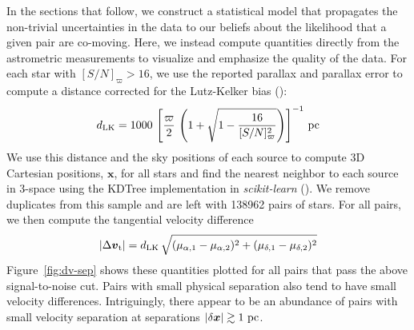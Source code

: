 \documentclass[manuscript, letterpaper]{aastex6}
\newcommand{\project}[1]{\textsl{#1}}
\newcommand{\figname}{Figure}
\newcommand{\bs}[1]{\boldsymbol{#1}}
\newcommand{\snr}{[S/N]_\varpi}
\begin{document}
In the sections that follow, we construct a statistical model that propagates
the non-trivial uncertainties in the data to our beliefs about the likelihood
that a given pair are co-moving. Here, we instead compute quantities directly
from the astrometric measurements to visualize and emphasize the quality of the
data. For each star with $\snr > 16$, we use the reported parallax and parallax
error to compute a distance corrected for the Lutz-Kelker bias
(\citealt{lutzkelker}):
\begin{equation}
  d_{\rm LK} = 1000 \, \left[\frac{\varpi}{2} \,
    \left(1 + \sqrt{1 - \frac{16}{\snr^2}} \right) \right]^{-1} \, {\rm pc}
\end{equation}
We use this distance and the sky positions of each source to compute 3D
Cartesian positions, $\boldsymbol{x}$, for all stars and find the nearest
neighbor to each source in 3-space using the KDTree implementation in
\project{scikit-learn} (\citealt{scikit-learn}). We remove duplicates from
this sample and are left with 138962 pairs of stars. For all pairs, we then
compute the tangential velocity difference
\begin{equation}
  |\Delta \bs{v}_{\rm t}| = d_{\rm LK} \,
                            \sqrt{(\mu_{\alpha,1}-\mu_{\alpha,2})^2 +
                                  (\mu_{\delta,1}-\mu_{\delta,2})^2}
\end{equation}
\figname~\ref{fig:dv-sep} shows these quantities plotted for all pairs that pass
the above signal-to-noise cut. Pairs with small physical separation also tend to
have small velocity differences. Intriguingly, there appear to be an abundance
of pairs with small velocity separation at separations $|\delta\bs{x}| \gtrsim
1~{\rm pc}$.
\end{document}
